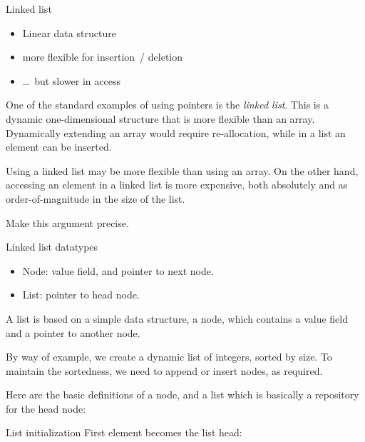 \begin{block}{Linked list}
  \label{sl:flink1}
  \begin{itemize}
  \item Linear data structure
  \item more flexible for insertion~/ deletion
  \item \ldots~but slower in access
  \end{itemize}
\end{block}

One of the standard examples of using pointers is the
\emph{linked list}. This is a dynamic one-dimensional structure
that is more flexible than an array. Dynamically extending an array
would require re-allocation, while in a list an element can be
inserted.

\begin{exercise}
  Using a linked list may be more flexible than using an array.
  On the other hand, accessing an element in a linked list is
  more expensive, both absolutely and as order-of-magnitude in the size
  of the list.

  Make this argument precise.
\end{exercise}

\begin{block}{Linked list datatypes}
  \label{sl:flink2}
  \begin{itemize}
  \item Node: value field, and pointer to next node.
  \item List: pointer to head node.
  \end{itemize}
\end{block}

A list is based on a simple data structure, a node, which contains a
value field and a pointer to another node.

By way of example, we create a dynamic list of integers, sorted by
size. To maintain the sortedness, we need to append or insert nodes,
as required.

Here are the basic definitions of a node, and a list which is
basically a repository for the head node:
%

\begin{block}{List initialization}
  \label{sl:flink3}
  First element becomes the list head:

  
\end{block}

